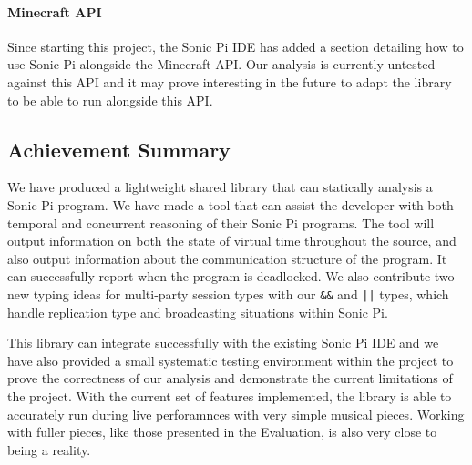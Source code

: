 \documentclass[11pt, abstracton, twoside, titlepage=true]{scrartcl}
\begin{document}
\paragraph{Minecraft API}
Since starting this project, the Sonic Pi IDE has added a section detailing how 
to use Sonic Pi alongside the Minecraft API. Our analysis is currently untested 
against this API and it may prove interesting in the future to adapt the library 
to be able to run alongside this API. 

\subsection{Achievement Summary}
We have produced a lightweight shared library that can statically analysis a 
Sonic Pi program. We have made a tool that can assist the developer with both temporal 
and concurrent reasoning of their Sonic Pi programs. The tool will output information 
on both the state of virtual time throughout the source, and also output information 
about the communication structure of the program. It can successfully report when 
the program is deadlocked. We also contribute two new typing ideas for multi-party 
session types with our \texttt{\&\&} and \texttt{||} types, which handle replication 
type and broadcasting situations within Sonic Pi. 

This library can integrate successfully with the existing Sonic Pi IDE and we 
have also provided a small systematic testing environment within the project 
to prove the correctness of our analysis and demonstrate the current limitations 
of the project. With the current set of features implemented, the library is able 
to accurately run during live perforamnces with very simple musical pieces. Working 
with fuller pieces, like those presented in the Evaluation, is also very close to 
being a reality.
\newpage
\end{document}

